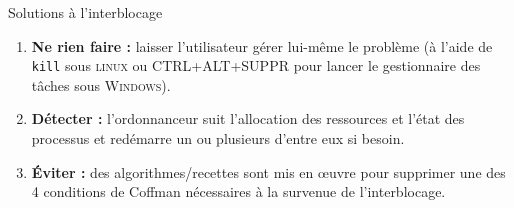 \documentclass[10pt]{nsibeamer}
\begin{document}
\begin{frame}[fragile]{Solutions à l'interblocage}
\begin{enumerate}[--]
	\item 	\textbf{Ne rien faire :} laisser l'utilisateur gérer lui-même le problème (à l'aide de \texttt{kill} sous \textsc{linux} ou CTRL+ALT+SUPPR pour lancer le gestionnaire des tâches sous \textsc{Windows}).
	\item 	\textbf{Détecter :}  l’ordonnanceur suit l’allocation des ressources et l’état des processus et redémarre un ou plusieurs d’entre eux si besoin.
    \item \textbf{\'Eviter :} des algorithmes/recettes sont mis en œuvre pour supprimer une des 4 conditions de Coffman nécessaires à la survenue de l’interblocage.
\end{enumerate}
\end{frame}
\end{document}

